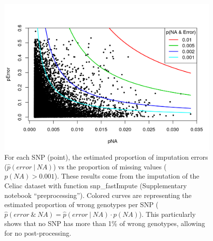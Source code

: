 \documentclass[a4paper, 11pt]{article}
\begin{document}
\begin{figure}[htpb]
\centerline{\includegraphics[width=\textwidth]{post-imputation}}
\caption{For each SNP (point), the estimated proportion of imputation errors ($\hat{p}(error~|~NA)$) vs the proportion of missing values ($p(NA) > 0.001$).
These results come from the imputation of the Celiac dataset with function snp\_fastImpute (Supplementary notebook ``preprocessing''). 
Colored curves are representing the estimated proportion of wrong genotypes per SNP ($\hat{p}(error~\&~NA) = \hat{p}(error~|~NA) \cdot p(NA)$). This particularly shows that no SNP has more than 1\% of wrong genotypes, allowing for no post-processing.}\label{fig:post-imputation}
\end{figure}

\vspace*{-12pt}



\end{document}
